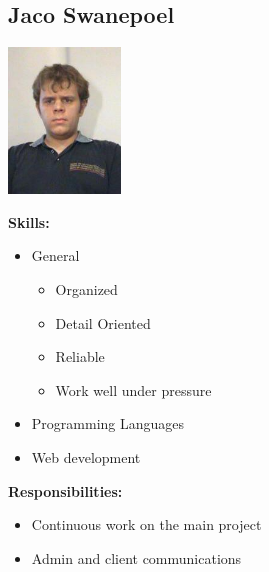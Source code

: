 \documentclass[a4paper,12pt,final]{article}
\begin{document}
\subsection{Jaco Swanepoel}
\begin{center}
\includegraphics[width=3cm]{jaco.jpg}
\end{center}
\textbf{Skills:}
\begin{itemize}
\item General
\begin{itemize}
\item Organized
	\item Detail Oriented
	\item Reliable
	\item Work well under pressure
\end{itemize}
\item Programming Languages
\begin{itemize}
\end{itemize}
\item Web development
\begin{itemize}
\end{itemize}
\end{itemize}
\textbf{Responsibilities:}
\begin{itemize}
\item Continuous work on the main project
\item Admin and client communications
\end{itemize}
\end{document}
